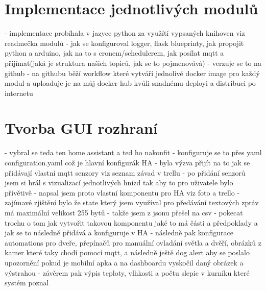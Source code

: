 \section{Implementace jednotlivých modulů}
- implementace probíhala v jazyce python za využítí vypsaných knihoven viz readmečka modulů\newline
- jak se konfiguroval logger, flask blueprinty, jak propojit python a arduino, jak na to s cronem/schedulerem, jak posílat mqtt a přijímat(jaká je struktura našich topiců, jak se to pojmenovává)
- verzuje se to na github
- na githubu běží workflow které vytváří jednolivé docker image pro každý modul a uploaduje je na můj docker hub kvůli snadnému deployi a distribuci po internetu


\section{Tvorba GUI rozhraní}
- vybral se teda ten home assistant a ted ho nakonfit\newline
- konfiguruje se to přes yaml configuration.yaml což je hlavní konfigurák HA\newline
- byla výzva přijít na to jak se přidávají vlastní mqtt senzory viz seznam závad v trellu\newline
- po přidání senzorů jsem si hrál s vizualizací jednotlivých hnízd tak aby to pro uživatele bylo přívětivě\newline
- napsal jsem proto vlastní komponentu pro HA viz foto a trello\newline
- zajímavé zjištění bylo že state který jsem využíval pro předávání textových zpráv má maximální velikost 255 bytů\newline
- takže jsem z jsonu přešel na csv\newline
- pokecat trochu o tom jak vytvořit takovou komponentu jaké to má části a předpoklady a jak se to následně přidává a konfiguruje v HA\newline
- následně pak konfigurace automations pro dveře, přepínačů pro manuální ovladání světla a dvěří, obrázků z kamer které taky chodí pomocí mqtt, a následně ještě dog alert aby se poslalo upozornění pokud je mobilní apka a na dashboardu vyskočil daný obrázek a výstrahou\newline
- závěrem pak výpis teploty, vlhkosti a počtu slepic v kurníku které systém poznal\newline


